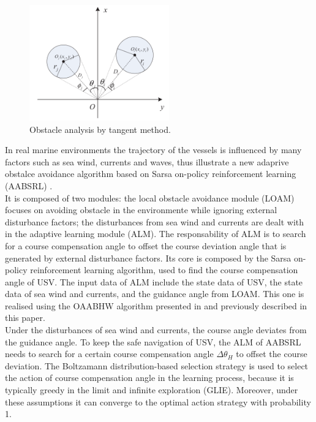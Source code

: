 \documentclass[12pt]{article}
\begin{document}
              \begin{figure}
                    \centering
                    \includegraphics[height=5cm]{./Images/Tang/tangent}
                    \caption{Obstacle analysis by tangent method.}
                    \label{fig:tangent}
              \end{figure}

              \indent In real marine environments the trajectory of the vessels is influenced by many factors such as sea wind, currents and waves, thus \textcite{Zhang2014} illustrate a new adaprive obstalce avoidance algorithm based on Sarsa on-policy reinforcement learning (AABSRL) \parencite{Sutton:1998:IRL:551283}.\\
              It is composed of two modules: the local obstacle avoidance module (LOAM) focuses on avoiding obstacle in the environmente while ignoring external disturbance factors; the disturbances from sea wind and currents are dealt with in the adaptive learning module (ALM). The responsability of ALM is to search for a course compensation angle to offset the course deviation angle that is generated by external disturbance factors. Its core is composed by the Sarsa on-policy reinforcement learning algorithm, used to find the course compensation angle of USV. The input data of ALM include the state data of USV, the state data of sea wind and currents, and the guidance angle from LOAM. This one is realised using the OAABHW algorithm presented in \parencite{Tang2012} and previously described in this paper.\\
              Under the disturbances of sea wind and currents, the course angle deviates from the guidance angle. To keep the safe navigation of USV, the ALM of AABSRL needs to search for a certain course compensation angle $\Delta \theta_H $ to offset the course deviation. The Boltzamann distribution-based selection strategy is used to select the action of course compensation angle in the learning process, because it is typically greedy in the limit and infinite exploration (GLIE). Moreover, under these assumptions it can converge to the optimal action strategy with probability 1.
\end{document}
